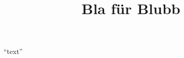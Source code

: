 \documentclass[english,ngerman]{tudscrposter}
\begin{document}

\title{Bla für Blubb}
\faculty[    s   d  ]{}

\begin{abstract}%
\blindtext
\end{abstract}

\maketitle
\enquote{text}
\end{document}
